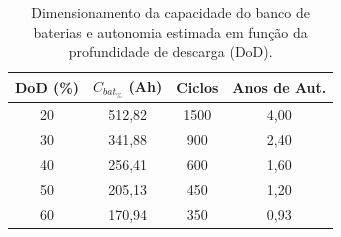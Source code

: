 \begin{table}[htbp]
  \centering
  \caption{Dimensionamento da capacidade do banco de baterias e autonomia estimada em função da profundidade de descarga (DoD).}
  \label{tab:dimensionamento_bateria}
  \begin{tabular}{cccc}
    \hline
    \rowcolor{gray!20}
    \textbf{DoD (\%)} & \textbf{$C_{bat_{\%}}$ (Ah)} & \textbf{Ciclos} & \textbf{Anos de Aut.} \\
    \hline
    20 & 512,82 & 1500 & 4,00 \\
    30 & 341,88 & 900 & 2,40 \\
    40 & 256,41 & 600 & 1,60 \\
    50 & 205,13 & 450 & 1,20 \\
    60 & 170,94 & 350 & 0,93 \\
    \hline
  \end{tabular}
  \begin{center}
  \end{center}
\end{table}
